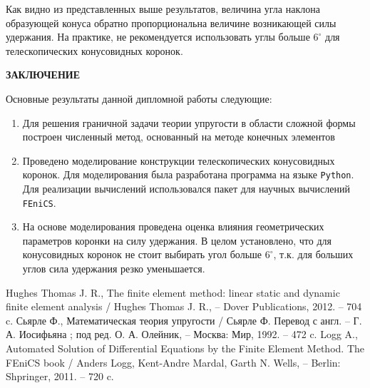 \documentclass[a4paper, 14pt]{extreport}
\begin{document}
Как видно из представленных выше результатов, величина 
угла наклона образующей конуса обратно пропорциональна величине возникающей силы удержания. На практике, не 
рекомендуется использовать углы больше $6^{\circ}$ для 
телескопических конусовидных коронок.

\newpage
{}
\begin{center}
	\Large{\textbf{ЗАКЛЮЧЕНИЕ}}
\end{center}

Основные результаты данной дипломной работы следующие:
\begin{enumerate}
\item  Для решения граничной задачи теории упругости в 
области сложной формы построен численный метод,
основанный на методе конечных элементов

\item Проведено моделирование конструкции телескопических 
конусовидных коронок. Для моделирования была разработана
программа на языке \texttt{Python}. Для реализации 
вычислений использовался пакет для научных вычислений
\texttt{FEniCS}.

\item На основе моделирования проведена оценка влияния 
геометрических параметров коронки на силу удержания.
В целом установлено, что для конусовидных коронок не 
стоит выбирать угол больше $6^{\circ}$, т.к. для больших углов 
сила удержания резко уменьшается.

\end{enumerate}


\newpage
{}
\renewcommand{\bibname}{\Large{СПИСОК ИСПОЛЬЗОВАННЫХ ИСТОЧНИКОВ}}
\begin{thebibliography}{9}

			Hughes Thomas J. R.,
			{The finite element method: linear static and dynamic finite element analysis} /
			Hughes Thomas J. R., -- Dover Publications, 2012. -- 704 c.
			Сьярле Ф.,
			{Математическая теория упругости} /
			Сьярле Ф. Перевод с англ. -- Г. А. Иосифьяна ; под ред. О. А. Олейник, -- Москва: Мир, 1992. -- 472 c.
			Logg A.,
			{Automated Solution of Differential Equations by the Finite Element Method. The FEniCS book} /
			Anders Logg, Kent-Andre Mardal, Garth N. Wells, -- Berlin: Shpringer, 2011. -- 720 c.
\end{thebibliography}
\end{document}
